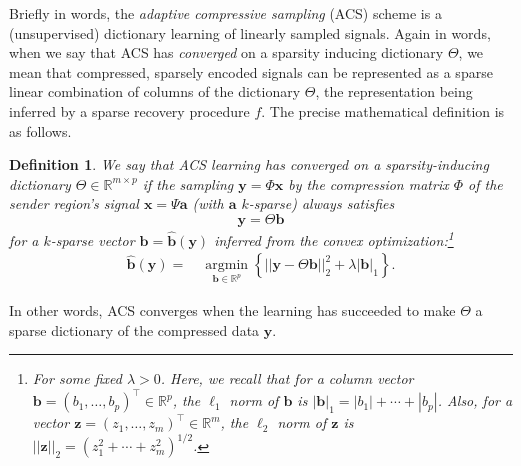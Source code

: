 \documentclass[11pt]{amsart}
\newtheorem{definition}{Definition}
\begin{document}
Briefly in words, the \textit{adaptive compressive sampling} (ACS) scheme is a (unsupervised) dictionary learning \cite{olshausenfield1996} of linearly sampled  signals.
Again in words, when we say that ACS has \textit{converged} on a sparsity inducing dictionary $\Theta$, we mean that compressed, sparsely encoded signals can be represented as a sparse linear combination of columns of the dictionary $\Theta$, the representation being inferred by a sparse recovery procedure $f$.  The precise mathematical definition is as follows.

\begin{definition}\label{def:converged}
We say that ACS learning has \textit{converged on a sparsity-inducing dictionary} $\Theta  \in \mathbb R^{m \times p}$ if the sampling $\mathbf{y} = \Phi \mathbf{x}$ by  the compression matrix $\Phi$ of the sender region's signal $\mathbf{x} = \Psi \mathbf{a}$ (with $\mathbf{a}$ $k$-sparse) always satisfies \[\mathbf{y} = \Theta\mathbf{b}\] for a $k$-sparse vector $\mathbf{b} = \widehat{\mathbf{b}}(\mathbf{y})$ inferred from the convex optimization:\footnote{For some fixed $\lambda > 0$.  Here, we recall that for a column vector $\mathbf{b} = (b_1,\ldots,b_p)^{\top} \in \mathbb R^p$, the $\ell_1$ norm of $\mathbf{b}$ is $|\mathbf{b}|_1 = |b_1| + \cdots + |b_p|$.  Also, for a vector $\mathbf{z} = (z_1,\ldots,z_m)^{\top} \in \mathbb R^m$, the $\ell_2$ norm of $\mathbf{z}$ is $||\mathbf{z}||_2 = (z_1^2 + \cdots + z_m^2)^{1/2}$.}
\begin{equation}\label{ACSbhat}
\begin{split}
 \widehat{\mathbf{b}}(\mathbf{y}) = \ & \underset{\mathbf{b} \in \mathbb R^p}{\operatorname{argmin}} \left\{ || \mathbf{y} - \Theta \mathbf{b} ||^2_2 + \lambda |\mathbf{b}|_1 \right\}.
\end{split}
\end{equation}
\end{definition}
In other words, ACS converges when the learning has succeeded to make $\Theta$ a sparse dictionary of the compressed data $\mathbf{y}$.  
\end{document}
